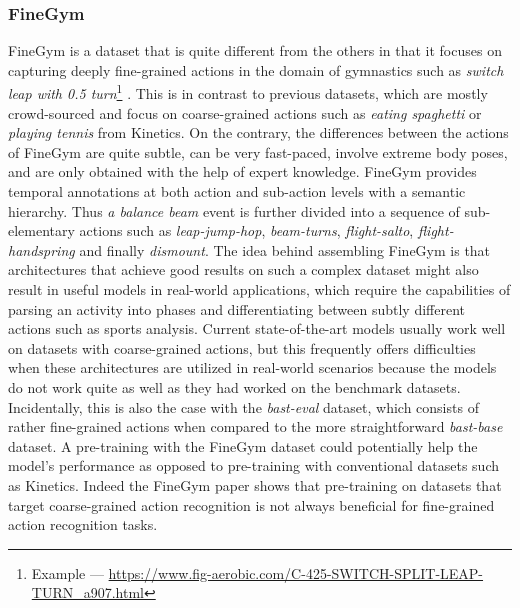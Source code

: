 \documentclass[extern,palatino]{cgMA}
\begin{document}
\subsubsection{FineGym}
\label{fine_gym}
FineGym is a dataset that is quite different from the others in that it focuses on capturing deeply fine-grained actions in the domain of gymnastics such as \textit{switch leap with 0.5 turn}\footnote{Example --- \url{https://www.fig-aerobic.com/C-425-SWITCH-SPLIT-LEAP-TURN_a907.html}} \cite{shao2020finegym}. This is in contrast to previous datasets, which are mostly crowd-sourced and focus on coarse-grained actions such as \textit{eating spaghetti} or \textit{playing tennis} from Kinetics. On the contrary, the differences between the actions of FineGym are quite subtle, can be very fast-paced, involve extreme body poses, and are only obtained with the help of expert knowledge. FineGym provides temporal annotations at both action and sub-action levels with a semantic hierarchy. Thus \textit{a balance beam} event is further divided into a sequence of sub-elementary actions such as \textit{leap-jump-hop}, \textit{beam-turns}, \textit{flight-salto}, \textit{flight-handspring} and finally \textit{dismount}. The idea behind assembling FineGym is that architectures that achieve good results on such a complex dataset might also result in useful models in real-world applications, which require the capabilities of parsing an activity into phases and differentiating between subtly different actions such as sports analysis. Current state-of-the-art models usually work well on datasets with coarse-grained actions, but this frequently offers difficulties when these architectures are utilized in real-world scenarios because the models do not work quite as well as they had worked on the benchmark datasets. Incidentally, this is also the case with the \textit{bast-eval} dataset, which consists of rather fine-grained actions when compared to the more straightforward \textit{bast-base} dataset. A pre-training with the FineGym dataset could potentially help the model's performance as opposed to pre-training with conventional datasets such as Kinetics. Indeed the FineGym paper shows that pre-training on datasets that target coarse-grained action recognition is not always beneficial for fine-grained action recognition tasks.
\end{document}
